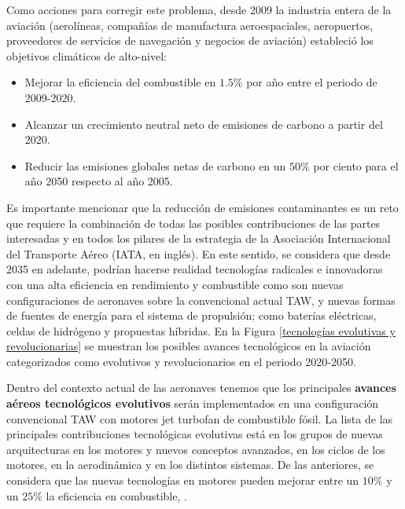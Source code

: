 Como acciones para corregir este problema, desde 2009 la industria entera de la aviación (aerolíneas, compañías de manufactura aeroespaciales, aeropuertos, proveedores de servicios de navegación y negocios de aviación) estableció los objetivos climáticos de alto-nivel:
\begin{itemize}
    \item Mejorar la eficiencia del  combustible en $1.5 \%$ por año entre el periodo de 2009-2020. 
    \item Alcanzar un crecimiento neutral neto de emisiones de carbono a partir del 2020.
    \item Reducir las emisiones globales netas de carbono en un $50 \%$ por ciento para el año 2050 respecto al año 2005. 
\end{itemize}
%
%
Es importante mencionar que la reducción de emisiones contaminantes es un reto que requiere la combinación de todas las posibles contribuciones de las partes interesadas y en todos los pilares de la estrategia de la Asociación Internacional del Transporte Aéreo (IATA, en inglés). 
%
En este sentido, se considera que desde 2035 en adelante, podrían hacerse realidad tecnologías radicales e innovadoras con una alta eficiencia en rendimiento y combustible como son nuevas configuraciones de aeronaves sobre la convencional actual TAW, y nuevas formas de fuentes de energía para el sistema de propulsión; como baterías eléctricas, celdas de hidrógeno y propuestas híbridas. 
%
En la Figura \ref{tecnologías evolutivas y revolucionarias} se muestran los posibles avances tecnológicos en la aviación categorizados como evolutivos y revolucionarios en el periodo 2020-2050.

Dentro del contexto actual de las aeronaves tenemos que los principales \textbf{avances aéreos tecnológicos evolutivos} serán implementados en una configuración convencional TAW con motores jet turbofan de combustible fósil. La lista de las principales contribuciones tecnológicas evolutivas está en los grupos de nuevas arquitecturas en los motores y nuevos conceptos avanzados, en los ciclos de los motores, en la aerodinámica y en los distintos sistemas. De las anteriores, se considera que las nuevas tecnologías en motores pueden mejorar entre un $10\%$ y un $25\%$ la eficiencia en combustible, \cite{IATA2020}.

